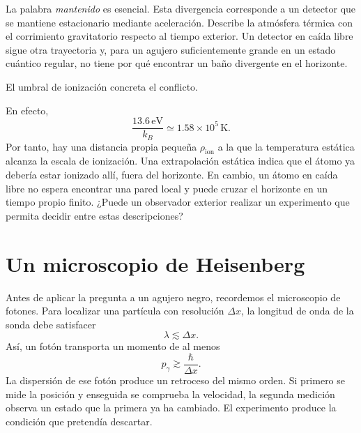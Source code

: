 La palabra \emph{mantenido} es esencial. Esta divergencia corresponde a un detector que se mantiene estacionario mediante aceleración. Describe la atmósfera térmica con el corrimiento gravitatorio respecto al tiempo exterior. Un detector en caída libre sigue otra trayectoria y, para un agujero suficientemente grande en un estado cuántico regular, no tiene por qué encontrar un baño divergente en el horizonte.

El umbral de ionización concreta el conflicto.

\begin{classroomqa}
\end{classroomqa}

En efecto,
\begin{equation}
\frac{13.6\,\mathrm{eV}}{k_B}\simeq1.58\times10^5\,\mathrm{K}.
\end{equation}
Por tanto, hay una distancia propia pequeña \(\rho_{\mathrm{ion}}\) a la que la temperatura estática alcanza la escala de ionización. Una extrapolación estática indica que el átomo ya debería estar ionizado allí, fuera del horizonte. En cambio, un átomo en caída libre no espera encontrar una pared local y puede cruzar el horizonte en un tiempo propio finito. ¿Puede un observador exterior realizar un experimento que permita decidir entre estas descripciones?

\section{Un microscopio de Heisenberg}

Antes de aplicar la pregunta a un agujero negro, recordemos el microscopio de fotones. Para localizar una partícula con resolución \(\Delta x\), la longitud de onda de la sonda debe satisfacer
\begin{equation}
\lambda\lesssim\Delta x.
\end{equation}
Así, un fotón transporta un momento de al menos
\begin{equation}
p_\gamma\gtrsim\frac{\hbar}{\Delta x}.
\label{eq:l05-microscope}
\end{equation}
La dispersión de ese fotón produce un retroceso del mismo orden. Si primero se mide la posición y enseguida se comprueba la velocidad, la segunda medición observa un estado que la primera ya ha cambiado. El experimento produce la condición que pretendía descartar.

